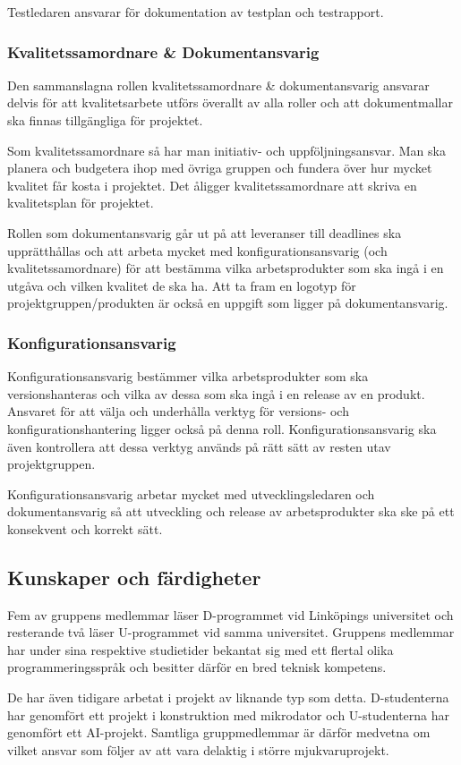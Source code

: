 \documentclass[a4paper,10pt]{article}
\begin{document}
Testledaren ansvarar för dokumentation av testplan och testrapport.
\subsubsection{Kvalitetssamordnare \& Dokumentansvarig}
Den sammanslagna rollen kvalitetssamordnare \& dokumentansvarig ansvarar delvis för att kvalitetsarbete utförs överallt av alla roller och att dokumentmallar ska finnas tillgängliga för projektet.

Som kvalitetssamordnare så har man initiativ- och uppföljningsansvar. Man ska planera och budgetera ihop med övriga gruppen och fundera över hur mycket kvalitet får kosta i projektet. Det åligger kvalitetssamordnare att skriva en kvalitetsplan för projektet.

Rollen som dokumentansvarig går ut på att leveranser till deadlines ska upprätthållas och att arbeta mycket med konfigurationsansvarig (och kvalitetssamordnare) för att bestämma vilka arbetsprodukter som ska ingå i en utgåva och vilken kvalitet de ska ha. Att ta fram en logotyp för projektgruppen/produkten är också en uppgift som ligger på dokumentansvarig.
\subsubsection{Konfigurationsansvarig}
Konfigurationsansvarig bestämmer vilka arbetsprodukter som ska versionshanteras och vilka av dessa som ska ingå i en release av en produkt. Ansvaret för att välja och underhålla verktyg för versions- och konfigurationshantering ligger också på denna roll. Konfigurationsansvarig ska även kontrollera att dessa verktyg används på rätt sätt av resten utav projektgruppen.

Konfigurationsansvarig arbetar mycket med utvecklingsledaren och dokumentansvarig så att utveckling och release av arbetsprodukter ska ske på ett konsekvent och korrekt sätt.
\subsection{Kunskaper och färdigheter}
Fem av gruppens medlemmar läser D-programmet vid Linköpings universitet och resterande två läser U-programmet vid samma universitet. Gruppens medlemmar har under sina respektive studietider bekantat sig med ett flertal olika programmeringsspråk och besitter därför en bred teknisk kompetens.

De har även tidigare arbetat i projekt av liknande typ som detta. D-studenterna har genomfört ett projekt i konstruktion med mikrodator och U-studenterna har genomfört ett AI-projekt. Samtliga gruppmedlemmar är därför medvetna om vilket ansvar som följer av att vara delaktig i större mjukvaruprojekt.
\end{document}
